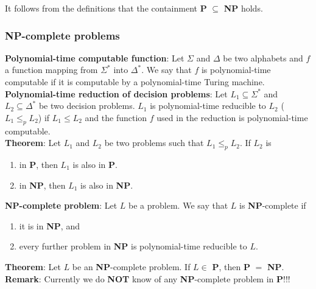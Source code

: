 \documentclass[margin=0px]{article}
\begin{document}
\noindent It follows from the definitions that the containment \textbf{P} $\subseteq$ \textbf{NP} holds.

\subsubsection{NP-complete problems}

\noindent \textbf{Polynomial-time computable function}: Let $\Sigma$ and $\Delta$ be two alphabets and $f$ a function mapping from $\Sigma^{*}$
into $\Delta^{*}$. We say that $f$ is polynomial-time computable if it is computable by a polynomial-time
Turing machine.\\

\noindent \textbf{Polynomial-time reduction of decision problems}:
Let $L_{1} \subseteq \Sigma^{*}$ and $L_{2} \subseteq \Delta^{*}$ be two decision problems.
$L_{1}$ is polynomial-time reducible to $L_{2}$ ($L_{1} \leq_{p} L_{2}$) if $L_{1} \leq L_{2}$ and
the function $f$ used in the reduction is polynomial-time computable.\\

\noindent \textbf{Theorem}: Let $L_{1}$ and $L_{2}$ be two problems such that $L_{1} \leq_{p} L_{2}$. If $L_{2}$ is

\begin{enumerate}
    \item	in \textbf{P}, then $L_{1}$ is also in \textbf{P}.

    \item	in \textbf{NP}, then $L_{1}$ is also in \textbf{NP}.
\end{enumerate}

\noindent \textbf{NP-complete problem}: Let $L$ be a problem. We say that $L$ is \textbf{NP}-complete if

\begin{enumerate}
    \item	it is in \textbf{NP}, and

    \item	every further problem in \textbf{NP} is polynomial-time reducible to $L$.

\end{enumerate}

\noindent \textbf{Theorem}: Let $L$ be an \textbf{NP}-complete problem. If $L \in$ \textbf{P}, then \textbf{P} $=$ \textbf{NP}.\\

\noindent \textbf{Remark}: Currently we do \textbf{NOT} know of any \textbf{NP}-complete problem in \textbf{P}!!!\\
\end{document}
